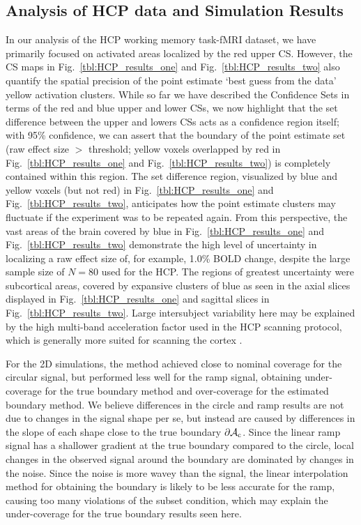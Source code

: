 \subsection{Analysis of HCP data and Simulation Results}
\label{sec:discussion_HCP_simultations}
In our analysis of the HCP working memory task-fMRI dataset, we have primarily focused on activated areas localized by the red upper CS. However, the CS maps in Fig.\ \ref{tbl:HCP_results_one} and Fig.\ \ref{tbl:HCP_results_two} also quantify the spatial precision of the point estimate `best guess from the data' yellow activation clusters. While so far we have described the Confidence Sets in terms of the red and blue upper and lower CSs, we now highlight that the set difference between the upper and lowers CSs acts as a confidence region itself; with 95\% confidence, we can assert that the boundary of the point estimate set (raw effect size $>$ threshold; yellow voxels overlapped by red in Fig.\ \ref{tbl:HCP_results_one} and Fig.\ \ref{tbl:HCP_results_two}) is completely contained within this region. The set difference region, visualized by blue and yellow voxels (but not red) in Fig.\ \ref{tbl:HCP_results_one} and Fig.\ \ref{tbl:HCP_results_two}, anticipates how the point estimate clusters may fluctuate if the experiment was to be repeated again. From this perspective, the vast areas of the brain covered by blue in Fig.\ \ref{tbl:HCP_results_one} and Fig.\ \ref{tbl:HCP_results_two} demonstrate the high level of uncertainty in localizing a raw effect size of, for example, 1.0\% BOLD change, despite the large sample size of $N = 80$ used for the HCP. The regions of greatest uncertainty were subcortical areas, covered by expansive clusters of blue as seen in the axial slices displayed in Fig.\ \ref{tbl:HCP_results_one} and sagittal slices in Fig.\ \ref{tbl:HCP_results_two}. Large intersubject variability here may be explained by the high multi-band acceleration factor used in the HCP scanning protocol, which is generally more suited for scanning the cortex \citep{Smith2013-ul}. 

For the 2D simulations, the method achieved close to nominal coverage for the circular signal, but performed less well for the ramp signal, obtaining under-coverage for the true boundary method and over-coverage for the estimated boundary method. We believe differences in the circle and ramp results are not due to changes in the signal shape per se, but instead are caused by differences in the slope of each shape close to the true boundary $\operatorname{\partial\mathcal{A}_{c}}$. Since the linear ramp signal has a shallower gradient at the true boundary compared to the circle, local changes in the observed signal around the boundary are dominated by changes in the noise. Since the noise is more wavey than the signal, the linear interpolation method for obtaining the boundary is likely to be less accurate for the ramp, causing too many violations of the subset condition, which may explain the under-coverage for the true boundary results seen here.

